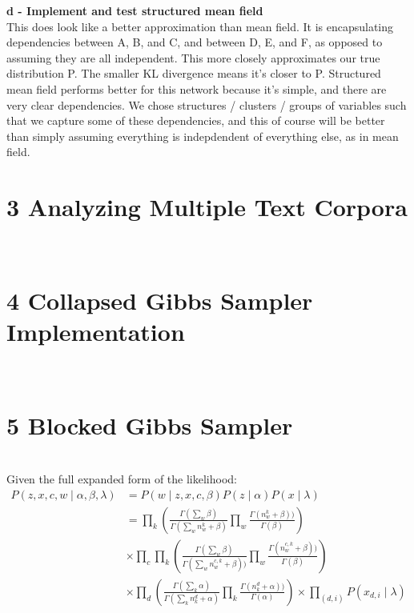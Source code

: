 \documentclass[12pt]{article}
\begin{document}
\noindent \textbf{d - Implement and test structured mean field}\\
This does look like a better approximation than mean field.  It is encapsulating dependencies between A, B, and C, and between D, E, and F, as opposed to assuming they are all independent.  This more closely approximates our true distribution P.  The smaller KL divergence means it's closer to P.  Structured mean field performs better for this network because it's simple, and there are very clear dependencies.  We chose structures / clusters / groups of variables such that we capture some of these dependencies, and this of course will be better than simply assuming everything is indepdendent of everything else, as in mean field.  

\section*{3 Analyzing Multiple Text Corpora}
\\

\section*{4 Collapsed Gibbs Sampler Implementation}
\\

\section*{5 Blocked Gibbs Sampler}
\\
Given the full expanded form of the likelihood:\\
\begin{align}
P (z, x, c, w\mid \alpha, \beta, \lambda) &= P (w \mid z, x, c, \beta)P (z\mid \alpha)P(x\mid \lambda) \nonumber\\
&=\prod_{k}(\frac{\Gamma(\sum_{w} \beta)}{\Gamma(\sum_{w} n^{k}_{w}+\beta)} \prod_{w} \frac{\Gamma(n^{k}_{w}+\beta))}{\Gamma(\beta)} )\nonumber\\
&\times \prod_{c}\prod_{k}(\frac{\Gamma(\sum_{w} \beta)}{\Gamma(\sum_{w} n^{c,k}_{w}+\beta))} \prod_{w} \frac{\Gamma(n^{c,k}_{w}+\beta))}{\Gamma(\beta)} )\nonumber\\
&\times \prod_{d}(\frac{\Gamma(\sum_{k} \alpha)}{\Gamma(\sum_{k} n^{d}_{k}+\alpha)} \prod_{k} \frac{\Gamma(n^{d}_{k}+\alpha))}{\Gamma(\alpha)} ) \times \prod_{(d,i)} P(x_{d,i} \mid \lambda)\nonumber\\
\end{align}
\end{document}
